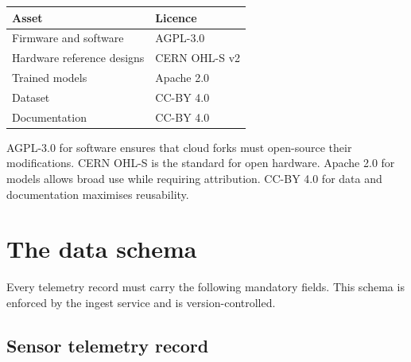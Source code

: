\begin{center}
\begin{tabular}{ll}
\toprule
\textbf{Asset} & \textbf{Licence} \\
\midrule
Firmware and software & AGPL-3.0 \\
Hardware reference designs & CERN OHL-S v2 \\
Trained models & Apache 2.0 \\
Dataset & CC-BY 4.0 \\
Documentation & CC-BY 4.0 \\
\bottomrule
\end{tabular}
\end{center}

AGPL-3.0 for software ensures that cloud forks must open-source their modifications. CERN OHL-S is the standard for open hardware. Apache 2.0 for models allows broad use while requiring attribution. CC-BY 4.0 for data and documentation maximises reusability.


\section{The data schema}

Every telemetry record must carry the following mandatory fields. This schema is enforced by the ingest service and is version-controlled.

\subsection{Sensor telemetry record}


